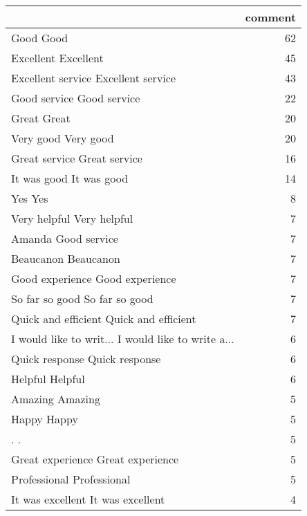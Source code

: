 \begin{tabular}{lr}
\toprule
{} &  comment \\
\midrule
Good Good                                          &       62 \\
Excellent Excellent                                &       45 \\
Excellent service Excellent service                &       43 \\
Good service Good service                          &       22 \\
Great Great                                        &       20 \\
Very good Very good                                &       20 \\
Great service Great service                        &       16 \\
It was good It was good                            &       14 \\
Yes Yes                                            &        8 \\
Very helpful Very helpful                          &        7 \\
Amanda Good service                                &        7 \\
Beaucanon Beaucanon                                &        7 \\
Good experience Good experience                    &        7 \\
So far so good So far so good                      &        7 \\
Quick and efficient Quick and efficient            &        7 \\
I would like to writ... I would like to write a... &        6 \\
Quick response Quick response                      &        6 \\
Helpful Helpful                                    &        6 \\
Amazing Amazing                                    &        5 \\
Happy Happy                                        &        5 \\
. .                                                &        5 \\
Great experience Great experience                  &        5 \\
Professional Professional                          &        5 \\
It was excellent It was excellent                  &        4 \\

\end{tabular}
